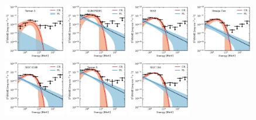 \documentclass[doublespace,nopageskip]{VTthesis} %
\begin{document}
\begin{appendices}
\begin{figure}
\includegraphics[width=0.24\textwidth]{Figures/Globular/spectra/2comp_27.pdf}
\includegraphics[width=0.24\textwidth]{Figures/Globular/spectra/2comp_1.pdf}
\includegraphics[width=0.24\textwidth]{Figures/Globular/spectra/2comp_11.pdf}
\includegraphics[width=0.24\textwidth]{Figures/Globular/spectra/2comp_6.pdf}
\includegraphics[width=0.24\textwidth]{Figures/Globular/spectra/2comp_15.pdf}
\includegraphics[width=0.24\textwidth]{Figures/Globular/spectra/2comp_29.pdf}
\includegraphics[width=0.24\textwidth]{Figures/Globular/spectra/2comp_3.pdf}
\end{figure}


\end{appendices}
\end{document}

